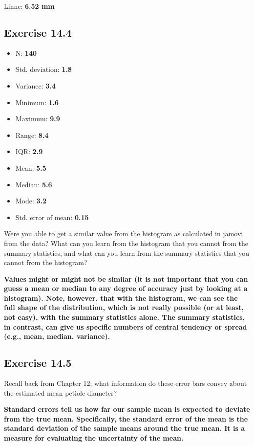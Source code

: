 \documentclass[
  openany]{krantz}
\providecommand{\tightlist}{%
  \setlength{\itemsep}{0pt}\setlength{\parskip}{0pt}}
\begin{document}
Linne: \textbf{6.52 mm}

\hypertarget{exercise-14.4}{%
\subsection{Exercise 14.4}\label{exercise-14.4}}

\begin{itemize}
\tightlist
\item
  N: \textbf{140}
\item
  Std. deviation: \textbf{1.8}
\item
  Variance: \textbf{3.4}
\item
  Minimum: \textbf{1.6}
\item
  Maximum: \textbf{9.9}
\item
  Range: \textbf{8.4}
\item
  IQR: \textbf{2.9}
\item
  Mean: \textbf{5.5}
\item
  Median: \textbf{5.6}
\item
  Mode: \textbf{3.2}
\item
  Std. error of mean: \textbf{0.15}
\end{itemize}

Were you able to get a similar value from the histogram as calculated in jamovi from the data? What can you learn from the histogram that you cannot from the summary statistics, and what can you learn from the summary statistics that you cannot from the histogram?

\textbf{Values might or might not be similar (it is not important that you can guess a mean or median to any degree of accuracy just by looking at a histogram). Note, however, that with the histogram, we can see the full shape of the distribution, which is not really possible (or at least, not easy), with the summary statistics alone. The summary statistics, in contrast, can give us specific numbers of central tendency or spread (e.g., mean, median, variance).}

\hypertarget{exercise-14.5}{%
\subsection{Exercise 14.5}\label{exercise-14.5}}

Recall back from Chapter 12; what information do these error bars convey about the estimated mean petiole diameter?

\textbf{Standard errors tell us how far our sample mean is expected to deviate from the true mean. Specifically, the standard error of the mean is the standard deviation of the sample means around the true mean. It is a measure for evaluating the uncertainty of the mean.}
\end{document}
